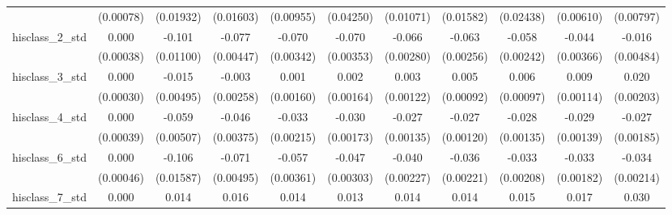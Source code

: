 {\begin{tabular}{l*{10}{c}}
                    &   (0.00078)         &   (0.01932)         &   (0.01603)         &   (0.00955)         &   (0.04250)         &   (0.01071)         &   (0.01582)         &   (0.02438)         &   (0.00610)         &   (0.00797)         \\
hisclass\_2\_std      &       0.000         &      -0.101\sym{***}&      -0.077\sym{***}&      -0.070\sym{***}&      -0.070\sym{***}&      -0.066\sym{***}&      -0.063\sym{***}&      -0.058\sym{***}&      -0.044\sym{***}&      -0.016\sym{**} \\
                    &   (0.00038)         &   (0.01100)         &   (0.00447)         &   (0.00342)         &   (0.00353)         &   (0.00280)         &   (0.00256)         &   (0.00242)         &   (0.00366)         &   (0.00484)         \\
hisclass\_3\_std      &       0.000         &      -0.015\sym{**} &      -0.003         &       0.001         &       0.002         &       0.003\sym{*}  &       0.005\sym{***}&       0.006\sym{***}&       0.009\sym{***}&       0.020\sym{***}\\
                    &   (0.00030)         &   (0.00495)         &   (0.00258)         &   (0.00160)         &   (0.00164)         &   (0.00122)         &   (0.00092)         &   (0.00097)         &   (0.00114)         &   (0.00203)         \\
hisclass\_4\_std      &       0.000         &      -0.059\sym{***}&      -0.046\sym{***}&      -0.033\sym{***}&      -0.030\sym{***}&      -0.027\sym{***}&      -0.027\sym{***}&      -0.028\sym{***}&      -0.029\sym{***}&      -0.027\sym{***}\\
                    &   (0.00039)         &   (0.00507)         &   (0.00375)         &   (0.00215)         &   (0.00173)         &   (0.00135)         &   (0.00120)         &   (0.00135)         &   (0.00139)         &   (0.00185)         \\
hisclass\_6\_std      &       0.000         &      -0.106\sym{***}&      -0.071\sym{***}&      -0.057\sym{***}&      -0.047\sym{***}&      -0.040\sym{***}&      -0.036\sym{***}&      -0.033\sym{***}&      -0.033\sym{***}&      -0.034\sym{***}\\
                    &   (0.00046)         &   (0.01587)         &   (0.00495)         &   (0.00361)         &   (0.00303)         &   (0.00227)         &   (0.00221)         &   (0.00208)         &   (0.00182)         &   (0.00214)         \\
hisclass\_7\_std      &       0.000         &       0.014\sym{***}&       0.016\sym{***}&       0.014\sym{***}&       0.013\sym{***}&       0.014\sym{***}&       0.014\sym{***}&       0.015\sym{***}&       0.017\sym{***}&       0.030\sym{***}\\

\end{tabular}}
